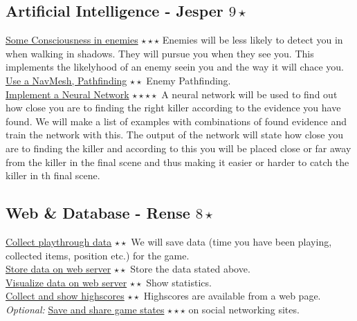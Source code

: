 \documentclass{article}
\begin{document}
		\subsection{Artificial Intelligence - Jesper $9 \star$}
			\underline{Some Consciousness in enemies} $\star \star \star$ Enemies will be less likely to detect you in when walking in shadows. They will pursue you when they see you. This implements the likelyhood of an enemy seein you and the way it will chace you.\\
			\underline{Use a NavMesh, Pathfinding} $\star \star$ Enemy Pathfinding.\\
			\underline{Implement a Neural Network} $\star \star \star \star$ A neural network will be used to find out how close you are to finding the right killer according to the evidence you have found. We will make a list of examples with combinations of found evidence and train the network with this. The output of the network will state how close you are to finding the killer and according to this you will be placed close or far away from the killer in the final scene and thus making it easier or harder to catch the killer in th final scene.
		\subsection{Web \& Database - Rense $8 \star$}
			\underline{Collect playthrough data} $\star \star$ We will save data (time you have been playing, collected items, position etc.) for the game. \\
			\underline{Store data on web server} $\star \star$ Store the data stated above. \\
			\underline{Visualize data on web server} $\star \star$ Show statistics. \\
			\underline{Collect and show highscores} $\star \star$ Highscores are available from a web page. \\
			\textit{Optional:} \underline{Save and share game states} $\star \star \star$ on social networking sites.
\end{document}
